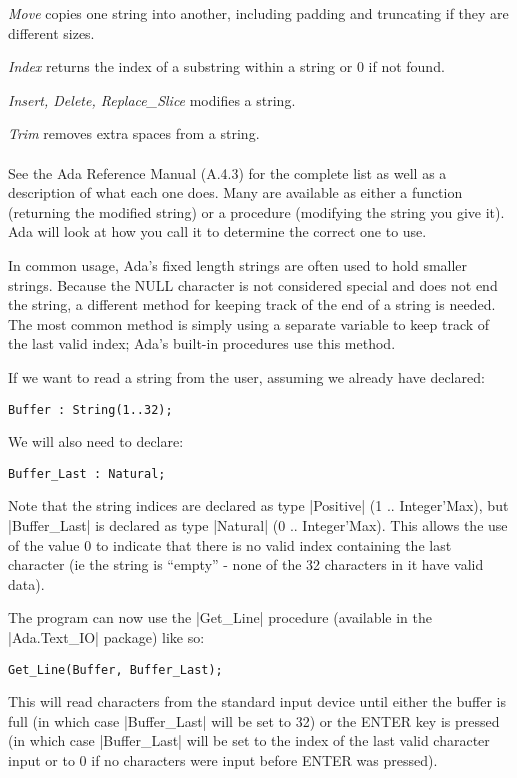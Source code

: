 \emph{Move} copies one string into another, including padding and truncating if they are
different sizes.

\emph{Index} returns the index of a substring within a string or 0 if not found.

\emph{Insert, Delete, Replace\_Slice} modifies a string.

\emph{Trim} removes extra spaces from a string.
\\\\ %
See the Ada Reference Manual (A.4.3) for the complete list as well as a description of what each
one does. Many are available as either a function (returning the modified string) or a procedure
(modifying the string you give it). Ada will look at how you call it to determine the correct
one to use.

In common usage, Ada's fixed length strings are often used to hold smaller strings. Because the
NULL character is not considered special and does not end the string, a different method for
keeping track of the end of a string is needed. The most common method is simply using a
separate variable to keep track of the last valid index; Ada's built-in procedures use this
method.

If we want to read a string from the user, assuming we already have declared:
\begin{lstlisting}
Buffer : String(1..32);
\end{lstlisting}

\noindent We will also need to declare:

\begin{lstlisting}
Buffer_Last : Natural;
\end{lstlisting}

\noindent Note that the string indices are declared as type |Positive| (1 .. Integer'Max), but
|Buffer_Last| is declared as type |Natural| (0 .. Integer'Max). This allows the use of the value
0 to indicate that there is no valid index containing the last character (ie the string is
``empty'' - none of the 32 characters in it have valid data).

The program can now use the |Get_Line| procedure (available in the |Ada.Text_IO| package) like
so:

\begin{lstlisting}
Get_Line(Buffer, Buffer_Last);
\end{lstlisting}

\noindent This will read characters from the standard input device until either the buffer is
full (in which case |Buffer_Last| will be set to 32) or the ENTER key is pressed (in which case
|Buffer_Last| will be set to the index of the last valid character input or to 0 if no
characters were input before ENTER was pressed).


